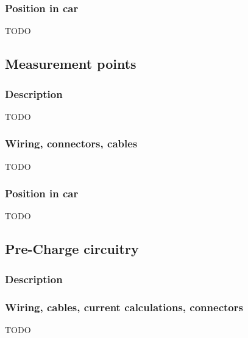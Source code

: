 \documentclass{article}
\begin{document}
\subsubsection{Position in car}
TODO

\subsection{Measurement points}
\subsubsection{Description}
TODO

\subsubsection{Wiring, connectors, cables}
TODO

\subsubsection{Position in car}
TODO

\subsection{Pre-Charge circuitry}
\subsubsection{Description}

\subsubsection{Wiring, cables, current calculations, connectors}
TODO
\end{document}
